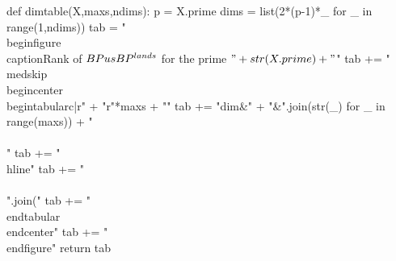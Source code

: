 \documentclass[a4paper]{paper}
\newcommand{\BP}{BP}
\newcommand{\us}{_\ast}
\begin{document}




\begin{sagesilent}
def dimtable(X,maxs,ndims):
    p = X.prime
    dims = list(2*(p-1)*_ for _ in range(1,ndims))
    tab = "\\begin{figure}\\caption{Rank of $\\BP\\us\\BP^{\\land s}$ for the prime $"+str(X.prime)+"$}\n"
    tab += "\\medskip\\begin{center}\\begin{tabular}{c|r" + "r"*maxs + "}\n"
    tab += "dim&" + "&".join(str(_) for _ in range(maxs)) + "\\\\\n"
    tab += "\\hline\n"
    tab += "\\\\\n".join("%
    tab += "\n\\end{tabular}\\end{center}"
    tab += "\n\\end{figure}"
    return tab
\end{sagesilent}

\end{document}
